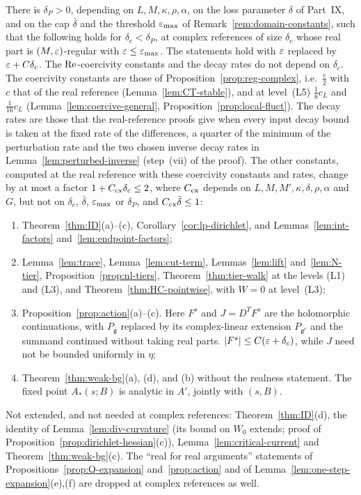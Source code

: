 \begin{proposition}\label{prop:complex-ext}
There is $\delta_P>0$, depending on $L,M,\kappa,\rho,\alpha$, on the loss parameter $\delta$ of Part~IX, and on the cap $\bar\delta$ and the threshold $\varepsilon_{\max}$ of Remark~\ref{rem:domain-constants}, such that the following holds for $\delta_c<\delta_P$, at complex references of size $\delta_c$ whose real part is $(M,\varepsilon)$-regular with $\varepsilon\le\varepsilon_{\max}$. The statements hold with $\varepsilon$ replaced by $\varepsilon+C\delta_c$. The $\operatorname{Re}$-coercivity constants and the decay rates do not depend on $\delta_c$. The coercivity constants are those of Proposition~\ref{prop:reg-complex}, i.e.\ $\frac c2$ with $c$ that of the real reference (Lemma~\ref{lem:CT-stable}), and at level~(L5) $\frac18c_L$ and $\frac1{16}c_L$ (Lemma~\ref{lem:coercive-general}, Proposition~\ref{prop:local-fluct}). The decay rates are those that the real-reference proofs give when every input decay bound is taken at the fixed rate of the differences, a quarter of the minimum of the perturbation rate and the two chosen inverse decay rates in Lemma~\ref{lem:perturbed-inverse} (step~(vii) of the proof). The other constants, computed at the real reference with these coercivity constants and rates, change by at most a factor $1+C_{\rm cx}\delta_c\le2$, where $C_{\rm cx}$ depends on $L,M,M',\kappa,\delta,\rho,\alpha$ and $G$, but not on $\delta_c$, $\bar\delta$, $\varepsilon_{\max}$ or $\delta_P$, and $C_{\rm cx}\bar\delta\le1$:
\begin{enumerate}[label=(\alph*)]
\item Theorem~\ref{thm:ID}(a)--(c), Corollary~\ref{cor:lp-dirichlet}, and Lemmas~\ref{lem:int-factors} and~\ref{lem:endpoint-factors};
\item Lemma~\ref{lem:trace}, Lemma~\ref{lem:cut-term}, Lemmas~\ref{lem:lift} and~\ref{lem:N-tier}, Proposition~\ref{prop:nl-tiers}, Theorem~\ref{thm:tier-walk} at the levels (L1) and (L3), and Theorem~\ref{thm:HC-pointwise}, with $W=0$ at level~(L3);
\item Proposition~\ref{prop:action}(a)--(c). Here $F^s$ and $J=D^TF^s$ are the holomorphic continuations, with $P_{\mathfrak g}$ replaced by its complex-linear extension $P_{\mathfrak g^c}$ and the summand continued without taking real parts. $|F^s|\le C(\varepsilon+\delta_c)$, while $J$ need not be bounded uniformly in $\eta$;
\item Theorem~\ref{thm:weak-bg}(a), (d), and (b) without the realness statement. The fixed point $A_*(s;B)$ is analytic in $A'$, jointly with $(s,B)$.
\end{enumerate}
Not extended, and not needed at complex references: Theorem~\ref{thm:ID}(d), the identity of Lemma~\ref{lem:div-curvature} (its bound on $W_0$ extends; proof of Proposition~\ref{prop:dirichlet-hessian}(c)), Lemma~\ref{lem:critical-current} and Theorem~\ref{thm:weak-bg}(c). The ``real for real arguments'' statements of Propositions~\ref{prop:Q-expansion} and~\ref{prop:action} and of Lemma~\ref{lem:one-step-expansion}(e),(f) are dropped at complex references as well.
\end{proposition}

